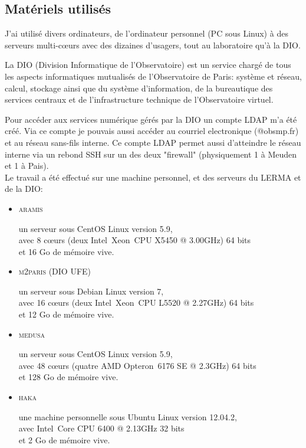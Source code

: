 \newpage
\subsection{Matériels utilisés}
J'ai utilisé divers ordinateurs, de l'ordinateur personnel (PC sous Linux) à des serveurs multi-cœurs avec des dizaines d'usagers, tout au laboratoire qu'à la DIO.

La DIO (Division Informatique de l’Observatoire) est un service chargé de tous les aspects informatiques mutualisés de l’Observatoire de Paris: système et réseau, calcul, stockage ainsi que du système d’information, de la bureautique des services centraux et de l’infrastructure technique de l’Observatoire virtuel.

Pour accéder aux services numérique gérés par la DIO un compte LDAP m'a été créé. Via ce compte je pouvais aussi accéder au courriel electronique (@obsmp.fr) et au réseau sans-fils interne. Ce compte LDAP permet aussi d'atteindre le réseau interne via un rebond SSH sur un des deux "firewall" (physiquement 1 à Meuden et 1 à Pais).\\

Le travail a été effectué sur une machine personnel, et des serveurs du LERMA et de la DIO:\\

\begin{itemize}
\item \textsc{\Large aramis}

	un serveur sous CentOS Linux version 5.9,\\
	avec 8 c\oe urs (deux Intel\textregistered\ Xeon\textregistered\ CPU           X5450  @ 3.00GHz)  64 bits\\
	et 16 Go de mémoire vive.
	\\
\item \textsc{\Large m2paris} (DIO UFE)

	un serveur sous Debian Linux version 7,\\
	avec 16 c\oe urs (deux Intel\textregistered\ Xeon\textregistered\ CPU           L5520  @ 2.27GHz)  64 bits\\
	et 12 Go de mémoire vive.
	\\
\item \textsc{\Large medusa}

	un serveur sous CentOS Linux version 5.9,\\
	avec 48 c\oe urs (quatre AMD Opteron\textregistered\  6176 SE @ 2.3GHz) 64 bits\\
	et 128 Go de mémoire vive.
	\\
\item \textsc{\Large haka}

	une machine personnelle sous Ubuntu Linux version 12.04.2,\\
	avec Intel\textregistered\ Core CPU          6400  @ 2.13GHz  32 bits\\
	et 2 Go de mémoire vive.
\end{itemize}



